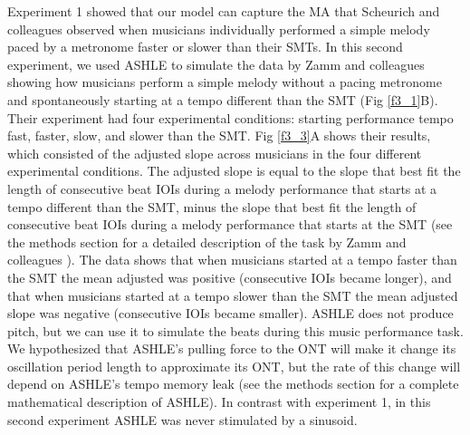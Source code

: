 \documentclass{report}
\begin{document}
Experiment 1 showed that our model can capture the MA that Scheurich and colleagues \cite{scheurich2018tapping} observed when musicians individually performed a simple melody paced by a metronome faster or slower than their SMTs. In this second experiment, we used ASHLE to simulate the data by Zamm and colleagues \cite{zamm2018musicians} showing how musicians perform a simple melody without a pacing metronome and spontaneously starting at a tempo different than the SMT (Fig \ref{f3_1}B). Their experiment had four experimental conditions: starting performance tempo fast, faster, slow, and slower than the SMT. Fig \ref{f3_3}A shows their results, which consisted of the adjusted slope across musicians in the four different experimental conditions. The adjusted slope is equal to the slope that best fit the length of consecutive beat IOIs during a melody performance that starts at a tempo different than the SMT, minus the slope that best fit the length of consecutive beat IOIs during a melody performance that starts at the SMT (see the methods section for a detailed description of the task by Zamm and colleagues \cite{zamm2018musicians}). The data shows that when musicians started at a tempo faster than the SMT the mean adjusted was positive (consecutive IOIs became longer), and that when musicians started at a tempo slower than the SMT the mean adjusted slope was negative (consecutive IOIs became smaller). ASHLE does not produce pitch, but we can use it to simulate the beats during this music performance task. We hypothesized that ASHLE's pulling force to the ONT will make it change its oscillation period length to approximate its ONT, but the rate of this change will depend on ASHLE's tempo memory leak (see the methods section for a complete mathematical description of ASHLE). In contrast with experiment 1, in this second experiment ASHLE was never stimulated by a sinusoid. 
\end{document}
